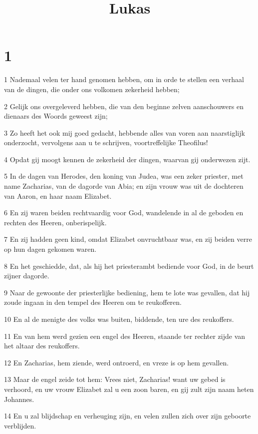 

\title{Lukas}



\chapter{1}

\par 1 Nademaal velen ter hand genomen hebben, om in orde te stellen een verhaal van de dingen, die onder ons volkomen zekerheid hebben;
\par 2 Gelijk ons overgeleverd hebben, die van den beginne zelven aanschouwers en dienaars des Woords geweest zijn;
\par 3 Zo heeft het ook mij goed gedacht, hebbende alles van voren aan naarstiglijk onderzocht, vervolgens aan u te schrijven, voortreffelijke Theofilus!
\par 4 Opdat gij moogt kennen de zekerheid der dingen, waarvan gij onderwezen zijt.
\par 5 In de dagen van Herodes, den koning van Judea, was een zeker priester, met name Zacharias, van de dagorde van Abia; en zijn vrouw was uit de dochteren van Aaron, en haar naam Elizabet.
\par 6 En zij waren beiden rechtvaardig voor God, wandelende in al de geboden en rechten des Heeren, onberispelijk.
\par 7 En zij hadden geen kind, omdat Elizabet onvruchtbaar was, en zij beiden verre op hun dagen gekomen waren.
\par 8 En het geschiedde, dat, als hij het priesterambt bediende voor God, in de beurt zijner dagorde.
\par 9 Naar de gewoonte der priesterlijke bediening, hem te lote was gevallen, dat hij zoude ingaan in den tempel des Heeren om te reukofferen.
\par 10 En al de menigte des volks was buiten, biddende, ten ure des reukoffers.
\par 11 En van hem werd gezien een engel des Heeren, staande ter rechter zijde van het altaar des reukoffers.
\par 12 En Zacharias, hem ziende, werd ontroerd, en vreze is op hem gevallen.
\par 13 Maar de engel zeide tot hem: Vrees niet, Zacharias! want uw gebed is verhoord, en uw vrouw Elizabet zal u een zoon baren, en gij zult zijn naam heten Johannes.
\par 14 En u zal blijdschap en verheuging zijn, en velen zullen zich over zijn geboorte verblijden.
